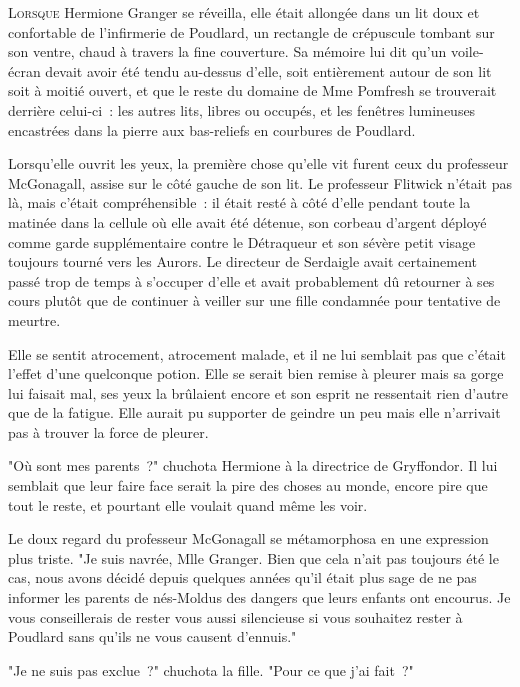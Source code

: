 
\lettrine{L}{orsque} Hermione Granger se réveilla, elle était allongée dans un lit doux et confortable de l'infirmerie de Poudlard, un rectangle de crépuscule tombant sur son ventre, chaud à travers la fine couverture. Sa mémoire lui dit qu'un voile-écran devait avoir été tendu au-dessus d'elle, soit entièrement autour de son lit soit à moitié ouvert, et que le reste du domaine de Mme Pomfresh se trouverait derrière celui-ci~: les autres lits, libres ou occupés, et les fenêtres lumineuses encastrées dans la pierre aux bas-reliefs en courbures de Poudlard.

Lorsqu'elle ouvrit les yeux, la première chose qu'elle vit furent ceux du professeur McGonagall, assise sur le côté gauche de son lit. Le professeur Flitwick n'était pas là, mais c'était compréhensible~: il était resté à côté d'elle pendant toute la matinée dans la cellule où elle avait été détenue, son corbeau d'argent déployé comme garde supplémentaire contre le Détraqueur et son sévère petit visage toujours tourné vers les Aurors. Le directeur de Serdaigle avait certainement passé trop de temps à s'occuper d'elle et avait probablement dû retourner à ses cours plutôt que de continuer à veiller sur une fille condamnée pour tentative de meurtre.

Elle se sentit atrocement, atrocement malade, et il ne lui semblait pas que c'était l'effet d'une quelconque potion. Elle se serait bien remise à pleurer mais sa gorge lui faisait mal, ses yeux la brûlaient encore et son esprit ne ressentait rien d'autre que de la fatigue. Elle aurait pu supporter de geindre un peu mais elle n'arrivait pas à trouver la force de pleurer.

"Où sont mes parents~?" chuchota Hermione à la directrice de Gryffondor. Il lui semblait que leur faire face serait la pire des choses au monde, encore pire que tout le reste, et pourtant elle voulait quand même les voir.

Le doux regard du professeur McGonagall se métamorphosa en une expression plus triste. "Je suis navrée, Mlle Granger. Bien que cela n'ait pas toujours été le cas, nous avons décidé depuis quelques années qu'il était plus sage de ne pas informer les parents de nés-Moldus des dangers que leurs enfants ont encourus. Je vous conseillerais de rester vous aussi silencieuse si vous souhaitez rester à Poudlard sans qu'ils ne vous causent d'ennuis."

"Je ne suis pas exclue~?" chuchota la fille. "Pour ce que j'ai fait~?"

